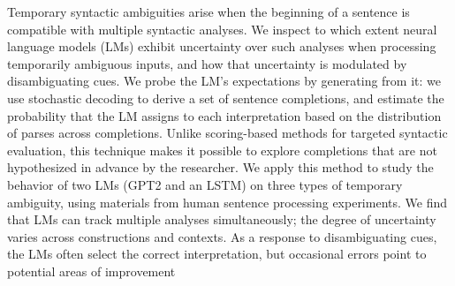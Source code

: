Temporary syntactic ambiguities arise when the beginning of a sentence is compatible with multiple syntactic analyses. We inspect to which extent neural language models (LMs) exhibit uncertainty over such analyses when processing temporarily ambiguous inputs, and how that uncertainty is modulated by disambiguating cues. We probe the LM's expectations by generating from it: we use stochastic decoding to derive a set of sentence completions, and estimate the probability that the LM assigns to each interpretation based on the distribution of parses across completions. Unlike scoring-based methods for targeted syntactic evaluation, this technique makes it possible to explore completions that are not hypothesized in advance by the researcher. We apply this method to study the behavior of two LMs (GPT2 and an LSTM) on three types of temporary ambiguity, using materials from human sentence processing experiments. We find that LMs can track multiple analyses simultaneously; the degree of uncertainty varies across constructions and contexts. As a response to disambiguating cues, the LMs often select the correct interpretation, but occasional errors point to potential areas of improvement
